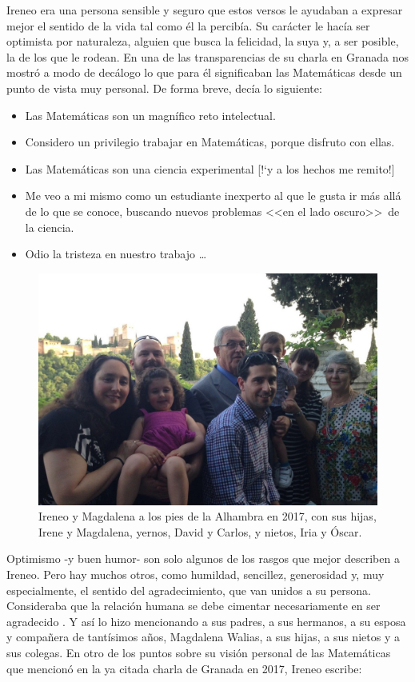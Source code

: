 Ireneo era una persona sensible y seguro que estos versos le ayudaban a expresar mejor el sentido de la vida tal como \'el la percib\'ia. Su car\'acter le hac\'ia ser optimista por naturaleza, alguien que busca la felicidad, la suya y, a ser posible, la de los que le rodean.    En una de las transparencias de su charla en Granada nos mostr\'o a modo de dec\'alogo lo que para \'el significaban las Matem\'aticas desde un punto de vista muy personal. De forma breve, dec\'ia lo siguiente: 
\begin{itemize}
\item Las Matem\'aticas son un magn\'ifico reto intelectual.
\item Considero un privilegio trabajar en Matem\'aticas, porque disfruto con ellas.
\item Las Matem\'aticas son una ciencia experimental [!`y a los hechos me remito!]
\item Me veo a mi mismo como un estudiante inexperto al que le gusta ir m\'as all\'a de lo que se conoce, buscando nuevos problemas <<en el lado oscuro>> \,de la ciencia.
\item Odio la tristeza en nuestro trabajo \dots
\end{itemize}

\begin{figure}%
\begin{center}
\includegraphics[width=0.9\linewidth]{IP_foto_granada1.jpg}
\caption{Ireneo y Magdalena a los pies de la Alhambra en 2017, con sus hijas, Irene y Magdalena, yernos, David y Carlos, y nietos, Iria y \'Oscar.}
\end{center}
\end{figure}

 
    
Optimismo -y buen humor- son solo algunos de los rasgos que mejor describen a Ireneo. Pero hay muchos otros, como humildad, sencillez,  generosidad y, muy especialmente, el sentido del agradecimiento, que van unidos a su persona. Consideraba que la relaci\'on humana se debe cimentar necesariamente en ser agradecido . Y as\'i lo hizo mencionando a sus padres, a sus hermanos, a su esposa y compa\~nera de tant\'isimos a\~nos, Magdalena Walias,
a sus hijas, a sus nietos y a sus colegas. En otro de los puntos sobre su visi\'on personal de las Matem\'aticas que mencion\'o en la ya citada charla de Granada en 2017, Ireneo escribe:

